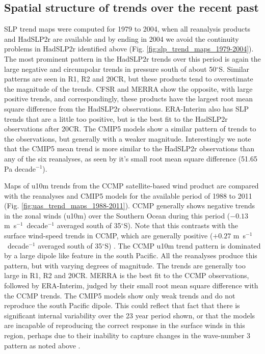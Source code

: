 \documentclass{ametsoc}
\begin{document}
\subsection{Spatial structure of trends over the recent past}
SLP trend maps were computed for 1979 to 2004, when all reanalysis products and HadSLP2r are available
and by ending in 2004 we avoid the continuity problems in HadSLP2r identified above 
(Fig. \ref{fig:slp_trend_maps_1979-2004}). The most prominent pattern in the HadSLP2r trends
over this period is again the large negative and circumpolar trends in pressure 
south of about 50$^{\circ}$S. Similar patterns are seen in R1, R2 and 20CR, but these products
tend to overestimate the magnitude of the trends. CFSR and MERRA show the opposite, with large
positive trends, and correspondingly, these products have the largest root mean square difference
from the HadSLP2r observations. ERA-Interim also has SLP trends that are a little too positive, but 
is the best fit to the HadSLP2r observations after 20CR.  The CMIP5 models show a similar pattern 
of trends to the observations,
but generally with a weaker magnitude. Interestingly we note that the CMIP5 mean trend is more similar to
the HadSLP2r observations than any of the six reanalyses, as seen by it's small root mean square 
difference (51.65 Pa decade$^{-1}$).

Maps of u10m trends from the CCMP satellite-based wind product are compared with the 
reanalyses and CMIP5 models for the available period of 1988 to 2011 
(Fig. \ref{fig:uas_trend_maps_1988-2011}). CCMP generally shows negative trends in the zonal winds
(u10m) over the Southern Ocean during this period ($-0.13$ m~s$^{-1}$~decade$^{-1}$ averaged south of 
35$^{\circ}$S). Note that this contrasts with the surface wind-speed
trends in CCMP, which are generally positive ($+0.27$ m~s$^{-1}$~decade$^{-1}$ averaged south of 
35$^{\circ}$S) \citep{Li_et_al_2013, Wanninkhof_et_al_2013}. The CCMP u10m trend pattern 
is dominated by a large dipole like feature in
the south Pacific. All the reanalyses produce this pattern, but with varying degrees of magnitude. The
trends are generally too large in R1, R2 and 20CR. MERRA is the best fit to the CCMP observations, followed
by ERA-Interim, judged by their small root mean square difference with the CCMP trends. The CMIP5 models 
show only weak trends and do not reproduce the south Pacific dipole. 
This could reflect that fact that there is significant internal variability over the 23 year period
shown, or that the models are incapable of reproducing the correct response in the surface winds
in this region, perhaps due to their inability to capture changes in the wave-number 3 pattern
as noted above \citep{Marshall_Bracegirdle_2014}.
\end{document}
